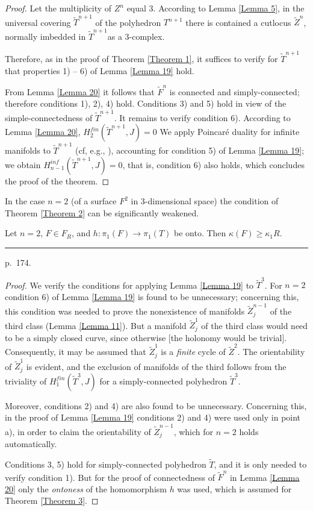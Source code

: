 \documentclass{amsart}
\theoremstyle{plain}
\theoremstyle{definition}
\begin{document}
{\sloppy
\begin{proof} Let the multiplicity of $Z^n$ equal 3. According
to Lemma \ref{Lemma 5}, in the universal covering $\tilde T^{n+1}$ of the
polyhedron $T^{n+1}$ there is contained a cutlocus $\tilde Z^n$,
normally imbedded in $\tilde T^{n+1}$as a 3-complex.

Therefore, as in the proof of Theorem \ref{Theorem 1}, it suffices to verify for
$\tilde T^{n+1}$that properties 1) -- 6) of Lemma \ref{Lemma 19} hold.

From Lemma \ref{Lemma 20} it follows that $\tilde F^n$ is connected and
simply-connected; therefore conditions 1), 2), 4) hold. Conditions
3) and 5) hold in view of the simple-connectedness of
$\tilde T^{n+1}$. It remains to verify condition 6). According to
Lemma \ref{Lemma 20}, $H^{fin}_2(\tilde T^{n+1}, J) =0$ We apply Poincar\'e
duality for infinite manifolds to $\tilde T^{n+1}$ (cf, e.g., \cite[\S\S 9, 33]{E}), accounting for condition 5) of Lemma \ref{Lemma 19}; we obtain
$H^{inf}_{n-1}(\tilde T^{n+1}, J) = 0$, that is, condition 6) also
holds, which concludes the proof of the theorem.
\end{proof}

}

In the case $n=2$ (of a surface $F^2$ in 3-dimensional space)
the condition of Theorem \ref{Theorem 2} can be significantly weakened.



\begin{thm} [= Theorem \ref{Theorem 3}] Let $n=2$, $F \in F_R$, and
$h: \pi_1(F) \to \pi_1(T)$ be onto. Then $\kappa(F) \ge \kappa_1R$.
\end{thm}

\medskip
\hrule\smallskip
\noindent p.~174.
\medskip

\begin{proof} We verify the conditions for applying Lemma \ref{Lemma 19}
to $\tilde T^3$. For $n=2$ condition 6) of Lemma \ref{Lemma 19} is found to
be unnecessary; concerning this, this condition was needed to
prove the nonexistence of manifolds $\tilde Z^{n-1}_j$ of the
third class (Lemma \ref{Lemma 11}). But a manifold $\tilde Z^1_j$ of the
third class would need to be a simply closed curve, since
otherwise [the holonomy would be trivial]. Consequently, it may
be assumed that $\tilde Z^1_j$ is a {\em finite} cycle of
$\tilde Z^2$. The orientability of $\tilde Z^1_j$ is evident, and
the exclusion of manifolds of the third follows from the
triviality of $H^{fin}_1(\tilde T^3, J)$ for a simply-connected
polyhedron $\tilde T^3$.

Moreover, conditions 2) and 4) are also found to be unnecessary.
Concerning this, in the proof of Lemma \ref{Lemma 19} conditions 2) and 4)
were used only in point a), in order to claim the orientability of
$\tilde Z^{n-1}_j$, which for $n=2$ holds automatically.

Conditions 3, 5) hold for simply-connected polyhedron $\tilde T$,
and it is only needed to verify condition 1). But for the proof of
connectedness of $\tilde F^n$ in Lemma \ref{Lemma 20} only the {\em ontoness}
of the homomorphism $h$ was used, which is assumed for
Theorem \ref{Theorem 3}.
\end{proof}
\end{document}
